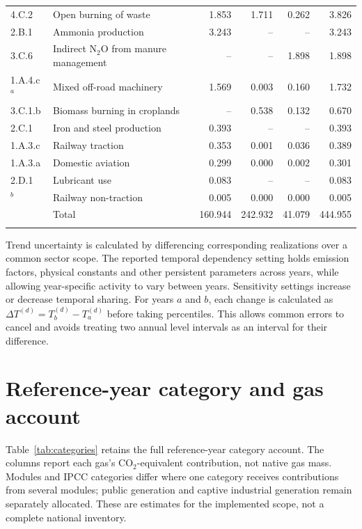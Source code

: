 \documentclass[essd]{copernicus}
\begin{document}
\begin{table}[t]
\begin{tabular}{lp{}rrrr}
4.C.2 & Open burning of waste & 1.853 & 1.711 & 0.262 & 3.826 \\
2.B.1 & Ammonia production & 3.243 & -- & -- & 3.243 \\
3.C.6 & Indirect N$_2$O from manure management & -- & -- & 1.898 & 1.898 \\
1.A.4.c$^{a}$ & Mixed off-road machinery & 1.569 & 0.003 & 0.160 & 1.732 \\
3.C.1.b & Biomass burning in croplands & -- & 0.538 & 0.132 & 0.670 \\
2.C.1 & Iron and steel production & 0.393 & -- & -- & 0.393 \\
1.A.3.c & Railway traction & 0.353 & 0.001 & 0.036 & 0.389 \\
1.A.3.a & Domestic aviation & 0.299 & 0.000 & 0.002 & 0.301 \\
2.D.1 & Lubricant use & 0.083 & -- & -- & 0.083 \\
$^{b}$ & Railway non-traction & 0.005 & 0.000 & 0.000 & 0.005 \\
\middlehline
 & Total & 160.944 & 242.932 & 41.079 & 444.955 \\
\bottomhline
\end{tabular}
\end{table}

Trend uncertainty is calculated by differencing corresponding realizations over a common sector scope. The reported temporal dependency setting holds emission factors, physical constants and other persistent parameters across years, while allowing year-specific activity to vary between years. Sensitivity settings increase or decrease temporal sharing. For years $a$ and $b$, each change is calculated as $\Delta T^{(d)}=T_b^{(d)}-T_a^{(d)}$ before taking percentiles. This allows common errors to cancel and avoids treating two annual level intervals as an interval for their difference.



\section{Reference-year category and gas account}
\label{sec:category_account}

Table~\ref{tab:categories} retains the full reference-year category account. The columns report each gas's CO$_2$-equivalent contribution, not native gas mass. Modules and IPCC categories differ where one category receives contributions from several modules; public generation and captive industrial generation remain separately allocated. These are estimates for the implemented scope, not a complete national inventory.
\end{document}
